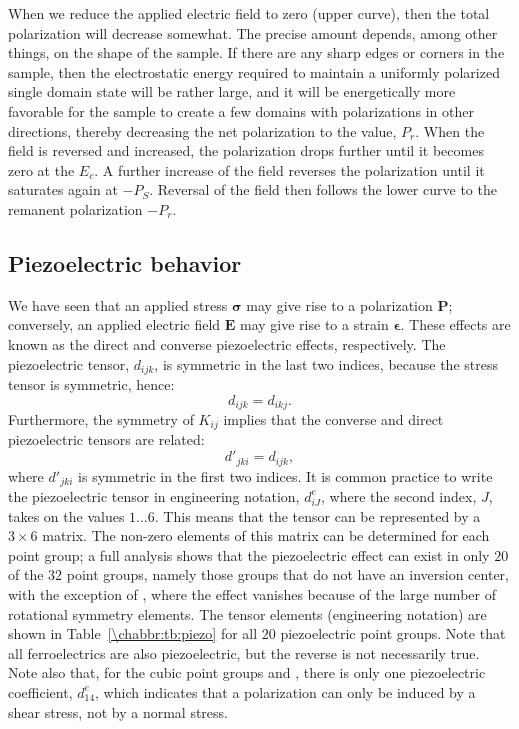 When we reduce the applied electric field to zero (upper curve), then the total polarization will decrease somewhat. The precise amount depends, among other things, on the shape of the sample. If there are any sharp edges or corners in the sample, then the electrostatic energy required to maintain a uniformly polarized single domain state will be rather large, and it will be energetically more favorable for the sample to create a few domains with polarizations in other directions, thereby decreasing the net polarization to the  value, $P_r$.  When the field is  reversed and increased, the polarization drops further until it becomes zero at the  $E_c$. A further increase of the field reverses the polarization until it saturates again at $-P_S$.  Reversal of the field then follows the lower curve to the remanent polarization $-P_r$.

\subsection{Piezoelectric behavior}

We have seen that an applied stress $\bm{\sigma}$ may give rise to a polarization $\mathbf{P}$; conversely, an applied electric field $\mathbf{E}$ may give rise to a strain $\bm{\epsilon}$.   These effects are known as the direct and converse piezoelectric effects, respectively.  The piezoelectric tensor, $d_{ijk}$, is symmetric in the last two indices, because the stress tensor is symmetric, hence:
\[
	d_{ijk} = d_{ikj}.
\]
Furthermore, the symmetry of $K_{ij}$ implies that the converse and direct piezoelectric tensors are related:
\[
	d'_{jki} = d_{ijk},
\]
where $d'_{jki}$ is symmetric in the first two indices.  It is common practice to write the piezoelectric tensor in engineering notation, $d^e_{iJ}$, where the second index, $J$, takes on the values $1\ldots 6$.  This means that  the tensor can be represented by a $3\times 6$ matrix.  The non-zero elements of this matrix can be determined for each point group; a full analysis shows that the piezoelectric effect can exist in only $20$ of the $32$ point groups, namely those groups that do not have an inversion center, with the exception of , where the effect vanishes because of the large number of rotational symmetry elements. The tensor elements (engineering notation) are shown in Table~\ref{\chabbr:tb:piezo} for all $20$ piezoelectric point groups. Note that all ferroelectrics are also piezoelectric, but the reverse is not necessarily true. Note also that, for the cubic point groups  and , there is only one piezoelectric coefficient, $d^e_{14}$, which indicates that a polarization can only be induced by a shear stress, not by a normal stress.

